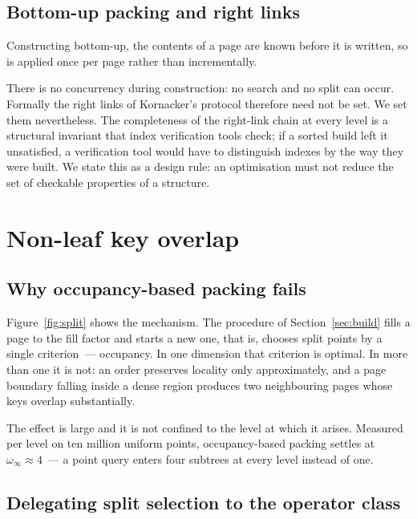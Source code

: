 \subsection{Bottom-up packing and right links}

Constructing bottom-up, the contents of a page are known before it is written,
so  is applied once per page rather than incrementally.

There is no concurrency during construction: no search and no split can occur.
Formally the right links of Kornacker's protocol therefore need not be set. We
set them nevertheless. The completeness of the right-link chain at every level
is a structural invariant that index verification tools check; if a sorted build
left it unsatisfied, a verification tool would have to distinguish indexes by
the way they were built. We state this as a design rule: an optimisation must
not reduce the set of checkable properties of a structure.

\section{Non-leaf key overlap}
\label{sec:overlap}



\subsection{Why occupancy-based packing fails}

Figure~\ref{fig:split} shows the mechanism. The procedure of
Section~\ref{sec:build} fills a page to the fill factor and
starts a new one, that is, chooses split points by a single criterion~---
occupancy. In one dimension that criterion is optimal. In more than one it is
not: an order preserves locality only approximately, and a page boundary falling
inside a dense region produces two neighbouring pages whose keys overlap
substantially.

The effect is large and it is not confined to the level at which it arises.
Measured per level on ten million uniform points, occupancy-based packing
settles at $\omega_\infty \approx 4$~--- a point query enters four subtrees at
every level instead of one.

\subsection{Delegating split selection to the operator class}

